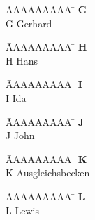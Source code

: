 \documentclass[a4paper, fleqn, headsepline, footsepline, 12pt, parskip=half]{scrartcl}
\begin{document}
\vspace*{-1.5cm}
\begin{tabbing}
	\hspace{0.0cm}  \= AAAAAAAAA \=       \hspace{2cm} \kill
	\>\textbf{G} 	\> \\
	\>G 			\>  Gerhard\\
\end{tabbing}

\vspace*{-1.5cm}
\begin{tabbing}
	\hspace{0.0cm}  \= AAAAAAAAA \=       \hspace{2cm} \kill
	\>\textbf{H} 	\> \\
	\>H 			\>  Hans\\
\end{tabbing} 

\vspace*{-1.5cm}
\begin{tabbing}
	\hspace{0.0cm}  \= AAAAAAAAA \=       \hspace{2cm} \kill
	\>\textbf{I} 	\> \\
	\>I 			\>  Ida\\
\end{tabbing} 

\vspace*{-1.5cm}
\begin{tabbing}
	\hspace{0.0cm}  \= AAAAAAAAA \=       \hspace{2cm} \kill
	\>\textbf{J} 	\> \\
	\>J 			\>  John\\
\end{tabbing}

\vspace*{-1.5cm}
\begin{tabbing}
	\hspace{0.0cm}  \= AAAAAAAAA \=       \hspace{2cm} \kill
	\>\textbf{K} 	\> \\
	\>K 			\>  Ausgleichsbecken\\
\end{tabbing}

\vspace*{-1.5cm}
\begin{tabbing}
	\hspace{0.0cm}  \= AAAAAAAAA \=       \hspace{2cm} \kill
	\>\textbf{L} 	\> \\
	\>L 			\>  Lewis\\
\end{tabbing}
\end{document}
